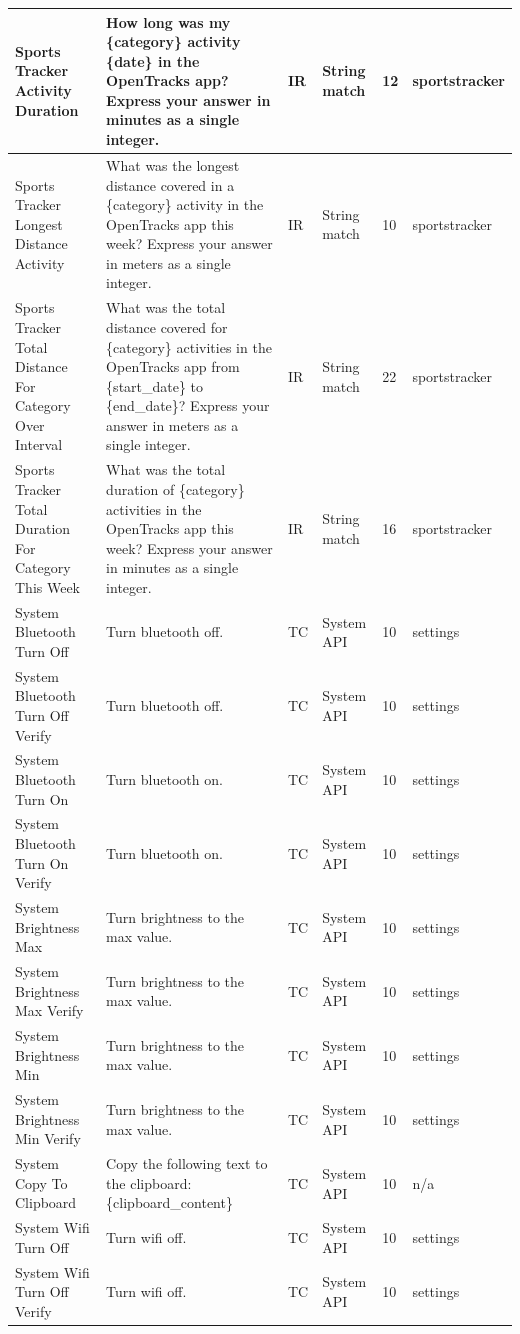 \documentclass{article}
\begin{document}
\begin{appendices}
\begin{longtable}{>{\RaggedRight\seqsplit}p{.8in}p{2in}p{.3in}p{.5in}p{.3in}p{.5in}}
\midrule
Sports Tracker Activity Duration & How long was my \{category\} activity \{date\} in the OpenTracks app? Express your answer in minutes as a single integer. & IR & String match & 12 & sportstracker \\
\midrule
Sports Tracker Longest Distance Activity & What was the longest distance covered in a \{category\} activity in the OpenTracks app this week? Express your answer in meters as a single integer. & IR & String match & 10 & sportstracker \\
\midrule
Sports Tracker Total Distance For Category Over Interval & What was the total distance covered for \{category\} activities in the OpenTracks app from \{start\_date\} to \{end\_date\}? Express your answer in meters as a single integer. & IR & String match & 22 & sportstracker \\
\midrule
Sports Tracker Total Duration For Category This Week & What was the total duration of \{category\} activities in the OpenTracks app this week? Express your answer in minutes as a single integer. & IR & String match & 16 & sportstracker \\
\midrule
System Bluetooth Turn Off & Turn bluetooth off. & TC & System API & 10 & settings \\
\midrule
System Bluetooth Turn Off Verify & Turn bluetooth off. & TC & System API & 10 & settings \\
\midrule
System Bluetooth Turn On & Turn bluetooth on. & TC & System API & 10 & settings \\
\midrule
System Bluetooth Turn On Verify & Turn bluetooth on. & TC & System API & 10 & settings \\
\midrule
System Brightness Max & Turn brightness to the max value. & TC & System API & 10 & settings \\
\midrule
System Brightness Max Verify & Turn brightness to the max value. & TC & System API & 10 & settings \\
\midrule
System Brightness Min & Turn brightness to the max value. & TC & System API & 10 & settings \\
\midrule
System Brightness Min Verify & Turn brightness to the max value. & TC & System API & 10 & settings \\
\midrule
System Copy To Clipboard & Copy the following text to the clipboard: \{clipboard\_content\} & TC & System API & 10 & n/a \\
\midrule
System Wifi Turn Off & Turn wifi off. & TC & System API & 10 & settings \\
\midrule
System Wifi Turn Off Verify & Turn wifi off. & TC & System API & 10 & settings \\

\end{longtable}
\end{appendices}
\end{document}
